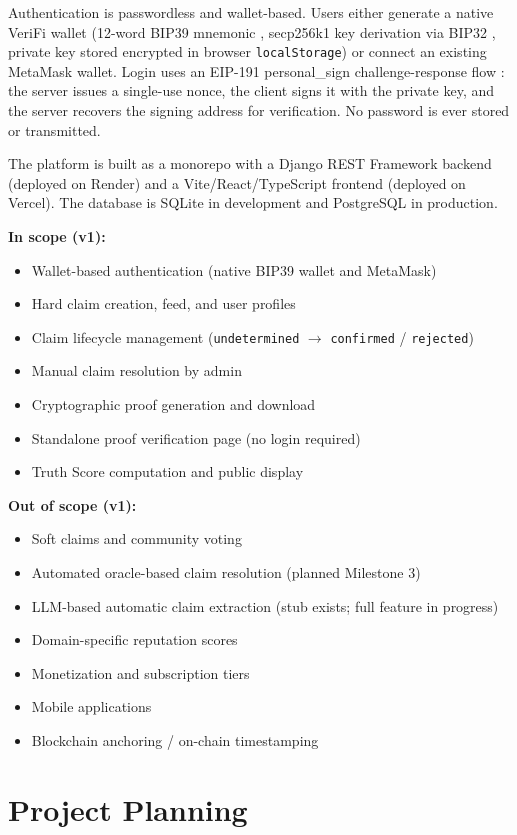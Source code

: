 \documentclass[a4paper,12pt]{report}
\begin{document}
Authentication is passwordless and wallet-based. Users either generate a native VeriFi wallet (12-word BIP39 mnemonic \cite{bip39}, secp256k1 key derivation via BIP32 \cite{bip32}, private key stored encrypted in browser \texttt{localStorage}) or connect an existing MetaMask wallet. Login uses an EIP-191 personal\_sign challenge-response flow \cite{eip191}: the server issues a single-use nonce, the client signs it with the private key, and the server recovers the signing address for verification. No password is ever stored or transmitted.

The platform is built as a monorepo with a Django REST Framework backend (deployed on Render) and a Vite/React/TypeScript frontend (deployed on Vercel). The database is SQLite in development and PostgreSQL in production.

\textbf{In scope (v1):}
\begin{itemize}
    \item Wallet-based authentication (native BIP39 wallet and MetaMask)
    \item Hard claim creation, feed, and user profiles
    \item Claim lifecycle management (\texttt{undetermined} $\rightarrow$ \texttt{confirmed} / \texttt{rejected})
    \item Manual claim resolution by admin
    \item Cryptographic proof generation and download
    \item Standalone proof verification page (no login required)
    \item Truth Score computation and public display
\end{itemize}

\textbf{Out of scope (v1):}
\begin{itemize}
    \item Soft claims and community voting
    \item Automated oracle-based claim resolution (planned Milestone 3)
    \item LLM-based automatic claim extraction (stub exists; full feature in progress)
    \item Domain-specific reputation scores
    \item Monetization and subscription tiers
    \item Mobile applications
    \item Blockchain anchoring / on-chain timestamping
\end{itemize}

\section{Project Planning}
\end{document}
